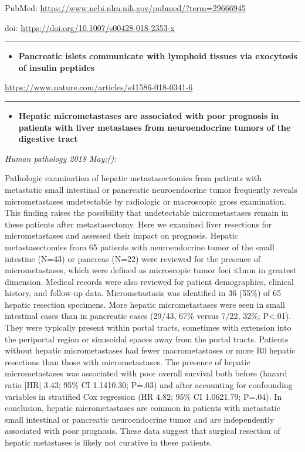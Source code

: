 \documentclass[]{article}
\providecommand{\tightlist}{%
  \setlength{\itemsep}{0pt}\setlength{\parskip}{0pt}}
\begin{document}
PubMed: \url{https://www.ncbi.nlm.nih.gov/pubmed/?term=29666945}

doi: \url{https://doi.org/10.1007/s00428-018-2353-x}

{}

{}

\begin{center}\rule{0.5\linewidth}{\linethickness}\end{center}

\begin{itemize}
\tightlist
\item
  \textbf{Pancreatic islets communicate with lymphoid tissues via
  exocytosis of insulin peptides}
\end{itemize}

\url{https://www.nature.com/articles/s41586-018-0341-6}

\begin{center}\rule{0.5\linewidth}{\linethickness}\end{center}

\begin{itemize}
\tightlist
\item
  \textbf{Hepatic micrometastases are associated with poor prognosis in
  patients with liver metastases from neuroendocrine tumors of the
  digestive tract}
\end{itemize}

\emph{Human pathology 2018 May;():}

Pathologic examination of hepatic metastasectomies from patients with
metastatic small intestinal or pancreatic neuroendocrine tumor
frequently reveals micrometastases undetectable by radiologic or
macroscopic gross examination. This finding raises the possibility that
undetectable micrometastases remain in these patients after
metastasectomy. Here we examined liver resections for micrometastases
and assessed their impact on prognosis. Hepatic metastasectomies from 65
patients with neuroendocrine tumor of the small intestine (N=43) or
pancreas (N=22) were reviewed for the presence of micrometastases, which
were defined as microscopic tumor foci ≤1mm in greatest dimension.
Medical records were also reviewed for patient demographics, clinical
history, and follow-up data. Micrometastasis was identified in 36 (55\%)
of 65 hepatic resection specimens. More hepatic micrometastases were
seen in small intestinal cases than in pancreatic cases (29/43, 67\%
versus 7/22, 32\%; P\textless{}.01). They were typically present within
portal tracts, sometimes with extension into the periportal region or
sinusoidal spaces away from the portal tracts. Patients without hepatic
micrometastases had fewer macrometastases or more R0 hepatic resections
than those with micrometastases. The presence of hepatic micrometastases
was associated with poor overall survival both before (hazard ratio
{[}HR{]} 3.43; 95\% CI 1.1410.30; P=.03) and after accounting for
confounding variables in stratified Cox regression (HR 4.82; 95\% CI
1.0621.79; P=.04). In conclusion, hepatic micrometastases are common in
patients with metastatic small intestinal or pancreatic neuroendocrine
tumor and are independently associated with poor prognosis. These data
suggest that surgical resection of hepatic metastases is likely not
curative in these patients.
\end{document}
